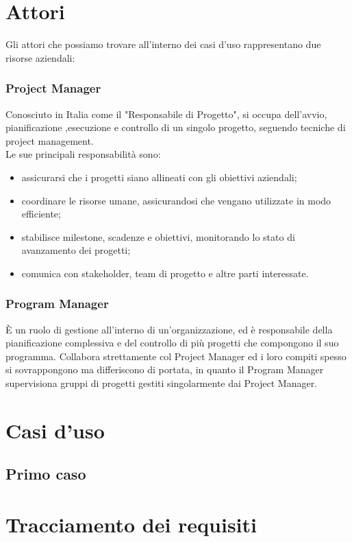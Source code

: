 \section{Attori}
Gli attori che possiamo trovare all'interno dei casi d'uso rappresentano due risorse aziendali:
\subsubsection*{Project Manager}
Conosciuto in Italia come il "Responsabile di Progetto", si occupa dell'avvio, pianificazione ,esecuzione e controllo di un singolo progetto, seguendo tecniche di project management.\\
Le sue principali responsabilità sono:
\begin{itemize}
\item assicurarsi che i progetti siano allineati con gli obiettivi aziendali;
\item coordinare le risorse umane, assicurandosi che vengano utilizzate in modo efficiente;
\item stabilisce milestone, scadenze e obiettivi, monitorando lo stato di avanzamento dei progetti;
\item comunica con stakeholder, team di progetto e altre parti interessate.
\end{itemize}
\subsubsection*{Program Manager}
È un ruolo di gestione all'interno di un'organizzazione, ed è responsabile della pianificazione complessiva e del controllo di più progetti che compongono il suo programma. Collabora strettamente col Project Manager ed i loro compiti spesso si sovrappongono ma differiscono di portata, in quanto il Program Manager supervisiona gruppi di progetti gestiti singolarmente dai Project Manager.

\section{Casi d'uso}
\subsection{Primo caso}


\section{Tracciamento dei requisiti}


 

